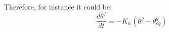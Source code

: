 Therefore, for instance it could be:
\begin{equation}
\frac{d \theta^f}{dt} = - K_w ({\theta^g - \theta^g_{eq}})
\end{equation}